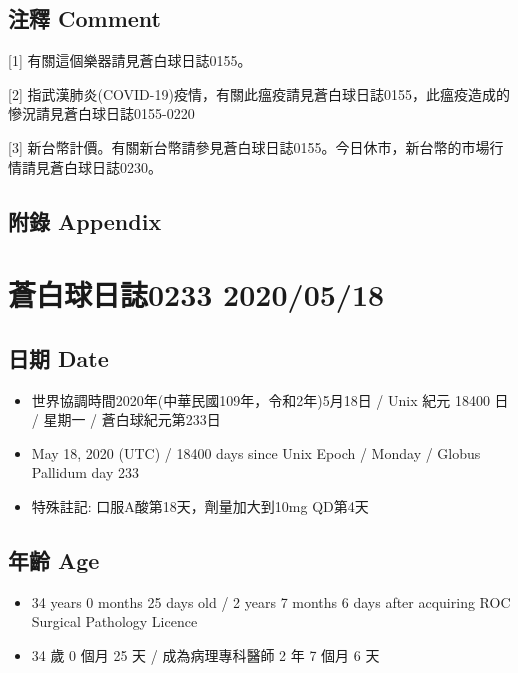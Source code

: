 \documentclass[a5paper, 12pt
]{book}
\providecommand{\tightlist}{%
  \setlength{\itemsep}{0pt}\setlength{\parskip}{0pt}}
\begin{document}
\hypertarget{ux6ce8ux91cb-comment-77}{%
\subsection{注釋 Comment}\label{ux6ce8ux91cb-comment-77}}

{[}1{]} 有關這個樂器請見蒼白球日誌0155。

{[}2{]}
指武漢肺炎(COVID-19)疫情，有關此瘟疫請見蒼白球日誌0155，此瘟疫造成的慘況請見蒼白球日誌0155-0220

{[}3{]}
新台幣計價。有關新台幣請參見蒼白球日誌0155。今日休市，新台幣的市場行情請見蒼白球日誌0230。

\hypertarget{ux9644ux9304-appendix-77}{%
\subsection{附錄 Appendix}\label{ux9644ux9304-appendix-77}}

\hypertarget{ux84bcux767dux7403ux65e5ux8a8c0233-20200518}{%
\section{蒼白球日誌0233
2020/05/18}\label{ux84bcux767dux7403ux65e5ux8a8c0233-20200518}}

\hypertarget{ux65e5ux671f-date-78}{%
\subsection{日期 Date}\label{ux65e5ux671f-date-78}}

\begin{itemize}
\tightlist
\item
  世界協調時間2020年(中華民國109年，令和2年)5月18日 / Unix 紀元 18400 日
  / 星期一 / 蒼白球紀元第233日
\item
  May 18, 2020 (UTC) / 18400 days since Unix Epoch / Monday / Globus
  Pallidum day 233
\item
  特殊註記: 口服A酸第18天，劑量加大到10mg QD第4天
\end{itemize}

\hypertarget{ux5e74ux9f61-age-78}{%
\subsection{年齡 Age}\label{ux5e74ux9f61-age-78}}

\begin{itemize}
\tightlist
\item
  34 years 0 months 25 days old / 2 years 7 months 6 days after
  acquiring ROC Surgical Pathology Licence
\item
  34 歲 0 個月 25 天 / 成為病理專科醫師 2 年 7 個月 6 天
\end{itemize}
\end{document}
